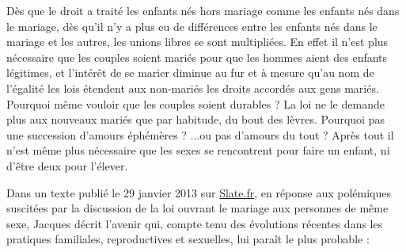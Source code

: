  Dès que le droit a traité les enfants nés hors mariage comme les enfants nés dans le mariage, dès qu'il n'y a plus eu de différences entre les enfants nés dans le mariage et les autres, les unions libres se sont multipliées. En effet il n'est plus nécessaire que les couples soient mariés pour que les hommes aient des enfants légitimes, et l'intérêt de se marier diminue au fur et à mesure qu'au nom de l'égalité les lois étendent aux non-mariés les droits accordés aux gens mariés. Pourquoi même vouloir que les couples soient durables ? La loi ne le demande plus aux nouveaux mariés que par habitude, du bout des lèvres. Pourquoi pas une succession d'amours éphémères ?  ...ou pas d'amours du tout ? Après tout il n'est même plus nécessaire que les sexes se rencontrent pour faire un enfant, ni d'être deux pour l'élever. 



Dans un texte publié le 29 janvier 2013 sur \href{http://www.slate.fr}{Slate.fr}, en réponse aux polémiques suscitées par la discussion de la loi ouvrant le mariage aux personnes de même sexe, Jacques  décrit l'avenir qui, compte tenu des évolutions récentes dans les pratiques familiales, reproductives et sexuelles, lui paraît le plus probable  : 

